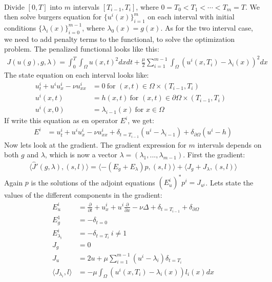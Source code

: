 \documentclass[11pt,a4paper]{article}
\begin{document}
\\
Divide $[0,T]$ into $m$ intervals $[T_{i-1},T_i]$, where $0=T_0<T_1<\cdots<T_m=T$. We then solve burgers equation for $\{u^i(x)\}_{i=1}^m$ on each interval with initial conditions $\{\lambda_i(x)\}_{i=0}^{m-1}$, where $\lambda_0(x)=g(x)$. As for the two interval case, we need to add penalty terms to the functional, to solve the optimization problem. The penalized functional looks like this:
\begin{align*}
J(u(g),g,\lambda) = \int_0^T\int_{\Omega} u(x,t)^2 dxdt + \frac{\mu}{2}\sum_{i=1}^{m-1}\int_{\Omega} (u^i(x,T_i)-\lambda_i(x))^2dx
\end{align*}
The state equation on each interval looks like:
\begin{align*}
u_t^i + u^iu_x^i - \nu u_{xx}^i &= 0 \ \text{for $(x,t)\in \Omega\times(T_{i-1},T_i)$}\\
u^i(x,t) &= h(x,t) \ \text{for $(x,t) \in\partial\Omega\times(T_{i-1},T_i)$ } \\
u^i(x,0) &= \lambda_{i-1}(x) \ \text{for $x \in\Omega$ }
\end{align*} 
If write this equation as en operator $E^i$, we get:
\begin{align*}
E^i &= u_t^i + u^iu_x^i - \nu u_{xx}^i +\delta_{t=T_{i-1}}(u^i-\lambda_{i-1}) + \delta_{\partial \Omega}(u^i-h)
\end{align*}
Now lets look at the gradient. The gradient expression for $m$ intervals depends on both $g$ and $\lambda$, which is now a vector $\lambda =(\lambda_1,...,\lambda_{m-1})$. First the gradient:
\begin{align*}
\langle \hat{J}'(g,\lambda), (s,l)\rangle =\langle -(E_g+E_{\lambda})p , (s,l)\rangle + \langle J_g+J_{\lambda}, (s,l)\rangle
\end{align*}
Again $p$ is the solutions of the adjoint equations $(E_u^i)^*p^i = J_{u^i}$. Lets state the values of the different components in the gradient: 
\begin{align*}
E_u^i&=\frac{\partial}{\partial t} + u_x^i + u^i\frac{\partial}{\partial x} - \nu\Delta + \delta_{t=T_{i-1}} + \delta_{\partial \Omega} \\
E_g^1 &= -\delta_{t=0} \\
E_{\lambda_i}^i &= -\delta_{t=T_i} \ i\neq 1 \\
J_g &= 0 \\
J_{u} &= 2u + \mu\sum_{i=1}^{m-1} (u^i - \lambda_i)\delta_{t=T_i} \\
\langle J_{\lambda_i},l\rangle &= -\mu\int_{\Omega} (u^i(x,T_i)-\lambda_i(x))l_i(x)dx
\end{align*}
\end{document}
